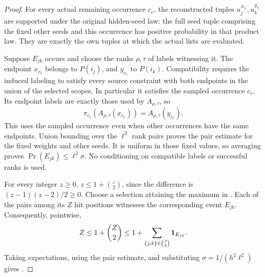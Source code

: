 \begin{proof}
For every actual remaining occurrence \(c_e\), the reconstructed
tuples \(u_j^{x_{c_e}},u_k^{y_{c_e}}\) are supported under the
original hidden-seed law: the full seed tuple comprising the fixed
other seeds and this occurrence has positive probability in that
product law. They are exactly the own tuples at which the actual
lists are evaluated.

Suppose \(E_{jk}\) occurs and choose the ranks \(\rho,\tau\)
of labels witnessing it. The endpoint \(x_{c_e}\) belongs to
\(P(i_j)\), and \(y_{c_e}\) to \(P(i_k)\). Compatibility
requires the induced labeling to satisfy every source constraint
with both endpoints in the union of the selected scopes. In
particular it satisfies the sampled occurrence \(c_e\). Its
endpoint labels are exactly those used by
\(A_{\rho,\tau}\), so
\[
 \pi_{c_e}(A_{\rho,\tau}(x_{c_e}))
                 =A_{\rho,\tau}(y_{c_e}).
\]
This uses the sampled occurrence even when other occurrences have
the same endpoints. Union bounding  over
the \(\ell^2\) rank pairs proves the pair estimate for the fixed
weights and other seeds. It is uniform in those fixed values, so
averaging proves \(\Pr(E_{jk})\leq\ell^2\sigma\). No
conditioning on compatible labels or successful ranks is used.

For every integer \(z\geq0\),
\(z\leq1+\binom z2\), since the difference is
\((z-1)(z-2)/2\geq0\). Choose a selection attaining the maximum
in . Each of the pairs among its \(Z\) hit
positions witnesses the corresponding event \(E_{jk}\).
Consequently, pointwise,
\begin{equation}
 Z\leq1+\binom Z2
   \leq1+\sum_{\{j,k\}\in\binom J2}\mathbf 1_{E_{jk}}.
 \label{dec:pair_count}
\end{equation}
Taking expectations, using the pair estimate, and substituting
\(\sigma=1/(h^2\ell^2)\) gives .
\end{proof}

